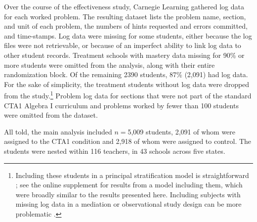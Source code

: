 \documentclass{article}\usepackage[]{graphicx}\usepackage[]{color}
\begin{document}
\begin{table}[ht]
\centering

\caption{Missingness information, control (``BaU'' or ``Business as
  Usual'') and treatment (``CTA1'') means, and balance for the
  covariates included in this study, from the high school year two
  stratum of CTA1 Effectiveness experiment. Imputation error is percent falsely classified for
  categorical variables (Race/Ethnicity, Sex, and Special Education)
  and standardized root mean squared error for Pretest, which is
  continuous. %
  Analysis done in \texttt{R} via \texttt{RItools} \citep{ritools}.}
\label{tab:covariateBalance}
\end{table}


Over the course of the effectiveness study, Carnegie Learning gathered
log data for each worked problem.
The resulting dataset lists the problem name, section, and unit of
each problem, the numbers of hints requested and errors committed, and time-stamps.
Log data were missing for some students, either because the log files were not retrievable, or because of an imperfect ability to link log data to other student records.
Treatment schools with mastery data missing
for 90\% or more students were omitted from the analysis, along with
their entire randomization block.
Of the remaining 2390 students, 87\% (2,091) had log
data.
For the sake of simplicity, the treatment students without log data
were dropped from the study.\footnote{Including these students in a
  principal stratification model is straightforward \citep{aoas}; see
  the online supplement for results from a model including them, which
  were broadly similar to the results presented here. Including
  subjects with missing log data in a mediation or observational study
  design can be more problematic \citep[see, e.g.][]{li2017identifiability}.}
Problem log data for sections that were not part of the
standard CTA1 Algebra I curriculum and problems worked by fewer than 100
students were omitted from the
dataset.

All told, the main analysis included $n=$5,009 students, 2,091 of whom were assigned to the CTA1 condition and 2,918 of whom were assigned to control.
The students were nested within 116 teachers, in 43 schools across five states.
\end{document}
